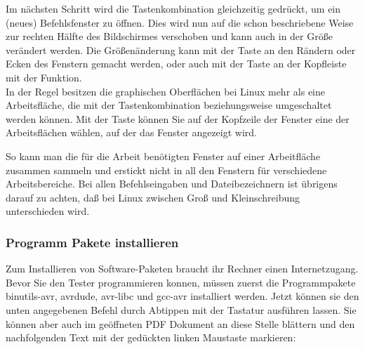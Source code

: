 Im nächsten Schritt wird die Tastenkombination  gleichzeitig gedrückt,
um ein (neues) Befehlsfenster zu öffnen.
Dies wird nun auf die schon beschriebene Weise zur rechten Hälfte des Bildschirmes verschoben und
kann auch in der Größe verändert werden.
Die Größenänderung kann mit der \LMB Taste an den Rändern oder Ecken des Fenstern gemacht werden,
oder auch mit der \RMB Taste an der Kopfleiste mit der  Funktion.\\

In der Regel besitzen die graphischen Oberflächen bei Linux mehr als eine Arbeitsfläche,
die mit der Tastenkombination 
beziehungsweise  umgeschaltet werden können.
Mit der \RMB Taste können Sie auf der Kopfzeile der Fenster eine
der Arbeitsflächen wählen, auf der das Fenster angezeigt wird.

So kann man die für die Arbeit benötigten Fenster auf einer Arbeitfläche
zusammen sammeln und erstickt nicht in all den Fenstern für verschiedene Arbeitsbereiche. 
Bei allen Befehlseingaben und Dateibezeichnern ist übrigens darauf zu  achten,
daß bei Linux zwischen Groß und Kleinschreibung unterschieden wird.


\subsubsection{Programm Pakete installieren}

Zum Installieren von Software-Paketen braucht ihr Rechner einen Internetzugang.
Bevor Sie den Tester programmieren konnen, müssen zuerst die Programmpakete
binutils-avr, avrdude, avr-libc und gcc-avr installiert werden.
Jetzt können sie den unten angegebenen Befehl durch Abtippen
mit der Tastatur ausführen lassen.
Sie können aber auch im geöffneten PDF Dokument an diese Stelle blättern
und den nachfolgenden Text mit der gedückten linken Maustaste \LMB markieren:

